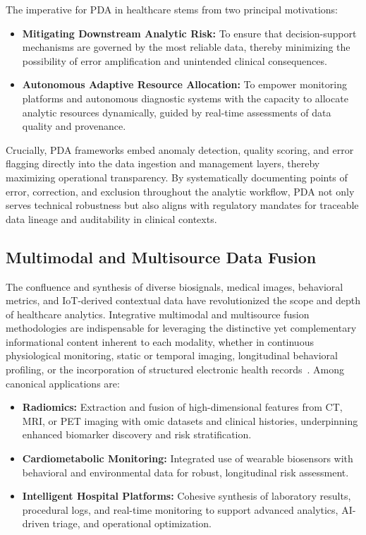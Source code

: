 \documentclass[sigconf]{acmart}
\begin{document}
The imperative for PDA in healthcare stems from two principal motivations:
\begin{itemize}
    \item \textbf{Mitigating Downstream Analytic Risk:} To ensure that decision-support mechanisms are governed by the most reliable data, thereby minimizing the possibility of error amplification and unintended clinical consequences.
    \item \textbf{Autonomous Adaptive Resource Allocation:} To empower monitoring platforms and autonomous diagnostic systems with the capacity to allocate analytic resources dynamically, guided by real-time assessments of data quality and provenance.
\end{itemize}
Crucially, PDA frameworks embed anomaly detection, quality scoring, and error flagging directly into the data ingestion and management layers, thereby maximizing operational transparency. By systematically documenting points of error, correction, and exclusion throughout the analytic workflow, PDA not only serves technical robustness but also aligns with regulatory mandates for traceable data lineage and auditability in clinical contexts.

\subsection{Multimodal and Multisource Data Fusion}

The confluence and synthesis of diverse biosignals, medical images, behavioral metrics, and IoT-derived contextual data have revolutionized the scope and depth of healthcare analytics. Integrative multimodal and multisource fusion methodologies are indispensable for leveraging the distinctive yet complementary informational content inherent to each modality, whether in continuous physiological monitoring, static or temporal imaging, longitudinal behavioral profiling, or the incorporation of structured electronic health records~\cite{ref41,ref42,ref46,ref50,ref53,ref54,ref60,ref61,ref62,ref64,ref65,ref70,ref71,ref84,ref86,ref89,ref90,ref106,ref107}. Among canonical applications are:
\begin{itemize}
    \item \textbf{Radiomics:} Extraction and fusion of high-dimensional features from CT, MRI, or PET imaging with omic datasets and clinical histories, underpinning enhanced biomarker discovery and risk stratification.
    \item \textbf{Cardiometabolic Monitoring:} Integrated use of wearable biosensors with behavioral and environmental data for robust, longitudinal risk assessment.
    \item \textbf{Intelligent Hospital Platforms:} Cohesive synthesis of laboratory results, procedural logs, and real-time monitoring to support advanced analytics, AI-driven triage, and operational optimization.
\end{itemize}
\end{document}

